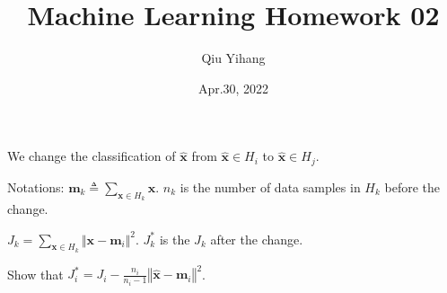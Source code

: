 \documentclass{article}
\title{\textbf{Machine Learning Homework 02}}
\author{Qiu Yihang}
\date{Apr.30, 2022}
\begin{document}
\maketitle

\hspace{-1.9em}
We change the classification of $\mathbf{\hat{x}}$ from $\mathbf{\hat{x}}\in H_i$ to $\mathbf{\hat{x}}\in H_j$. 

\hspace{-1.8em}
Notations: $\mathbf{m}_k\triangleq \sum_{\mathbf{x}\in H_k} \mathbf{x}$. $n_k$ is the number of data samples in $H_k$ before the change.

\hspace{3.2em}
$J_k = \sum_{\mathbf{x}\in H_k} \Vert\mathbf{x}-\mathbf{m}_i\Vert^2$. $J_k^*$ is the $J_k$ after the change.

\hspace{-1.8em}
Show that $J_i^*=J_i-\frac{n_i}{n_i-1}\left\Vert\hat{\mathbf{x}}-\mathbf{m}_i\right\Vert^2$.
\end{document}
